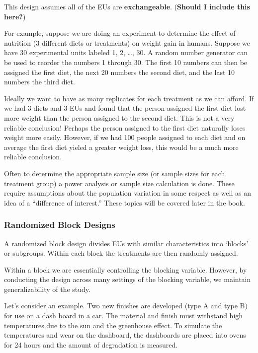 \documentclass[
]{book}
\theoremstyle{definition}
\theoremstyle{definition}
\theoremstyle{definition}
\theoremstyle{remark}
\begin{document}
This design assumes all of the EUs are \textbf{exchangeable}. (\textbf{Should I include this here?})

For example, suppose we are doing an experiment to determine the effect of nutrition (3 different diets or treatments) on weight gain in humans. Suppose we have 30 experimental units labeled 1, 2, \ldots{}, 30. A random number generator can be used to reorder the numbers 1 through 30. The first 10 numbers can then be assigned the first diet, the next 20 numbers the second diet, and the last 10 numbers the third diet.

Ideally we want to have as many replicates for each treatment as we can afford. If we had 3 diets and 3 EUs and found that the person assigned the first diet lost more weight than the person assigned to the second diet. This is not a very reliable conclusion! Perhaps the person assigned to the first diet naturally loses weight more easily. However, if we had 100 people assigned to each diet and on average the first diet yieled a greater weight loss, this would be a much more reliable conclusion.

Often to determine the appropriate sample size (or sample sizes for each treatment group) a power analysis or sample size calculation is done. These require assumptions about the population variation in some respect as well as an idea of a ``difference of interest.'' These topics will be covered later in the book.

\hypertarget{randomized-block-designs}{%
\subsubsection{Randomized Block Designs}\label{randomized-block-designs}}

A randomized block design divides EUs with similar characteristics into
`blocks' or subgroups. Within each block the treatments are then randomly assigned.

Within a block we are essentially controlling the blocking variable. However, by conducting the design across many settings of the blocking variable, we maintain generalizability of the study.

Let's consider an example. Two new finishes are developed (type A and type B) for use on a dash board in a car. The material and finish must withstand high temperatures due to the sun and the greenhouse effect. To simulate the temperatures and wear on the dashboard, the dashboards are placed into ovens for 24 hours and the amount of degradation is measured.
\end{document}
